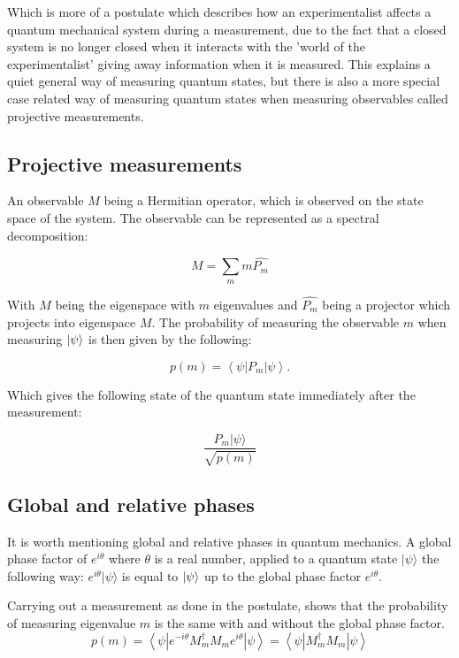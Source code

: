 \documentclass[../main.tex]{subfiles}
\begin{document}
Which is more of a postulate which describes how an experimentalist affects a quantum mechanical system during a measurement, due to the fact that a closed system is no longer closed when it interacts with the 'world of the experimentalist' giving away information when it is measured. This explains a quiet general way of measuring quantum states, but there is also a more special case related way of measuring quantum states when measuring observables called projective measurements.

\subsection{Projective measurements}
An observable $M$ being a Hermitian operator, which is observed on the state space of the system. The observable can be represented as a spectral decomposition:

\begin{equation*}
    M=\sum_{m} m \hat{P_{m}}
\end{equation*}

With $M$ being the eigenspace with $m$ eigenvalues and $\hat{P_m}$ being a projector which projects into eigenspace $M$. The probability of measuring the observable $m$ when measuring $\ket{\psi}$ is then given by the following:

\begin{equation*}
p(m)=\left\langle\psi\left|P_{m}\right| \psi\right\rangle .
\end{equation*}

Which gives the following state of the quantum state immediately after the measurement:

\begin{equation*}
\frac{P_{m}|\psi\rangle}{\sqrt{p(m)}}
\end{equation*}

\subsection{Global and relative phases}
It is worth mentioning global and relative phases in quantum mechanics. A global phase factor of $e^{i \theta}$ where $\theta$ is a real number, applied to a quantum state $|\psi\rangle$ the following way: $e^{i \theta}|\psi\rangle$ is equal to $\ket{\psi}$ up to the global phase factor $e^{i \theta}$.

Carrying out a measurement as done in the postulate, shows that the probability of measuring eigenvalue $m$ is the same with and without the global phase factor.
\begin{equation*}
    p(m)=\left\langle\psi\left|e^{-i \theta} M_{m}^{\dagger} M_{m} e^{i \theta}\right| \psi\right\rangle=\left\langle\psi\left|M_{m}^{\dagger} M_{m}\right| \psi\right\rangle
\end{equation*}
\end{document}
